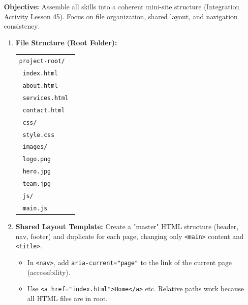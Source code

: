 \documentclass[11pt]{article}
\begin{document}
\begin{methode}
\textbf{Objective:} Assemble all skills into a coherent mini-site structure (Integration Activity \textemdash Lesson 45). Focus on file organization, shared layout, and navigation consistency.
\begin{enumerate}
    \item \textbf{File Structure (Root Folder):}
        \begin{center}
        \begin{tabular}{|p{0.95\linewidth}|}\hline
        \texttt{project-root/}\\
        \texttt{\textbar{}\textbar{} index.html}\\
        \texttt{\textbar{}\textbar{} about.html}\\
        \texttt{\textbar{}\textbar{} services.html}\\
        \texttt{\textbar{}\textbar{} contact.html}\\
        \texttt{\textbar{}\textbar{} css/}\\
        \texttt{\textbar{}\textbar{} \textbar{}\textbar{} style.css}\\
        \texttt{\textbar{}\textbar{} images/}\\
        \texttt{\textbar{}\textbar{} \textbar{}\textbar{} logo.png}\\
        \texttt{\textbar{}\textbar{} \textbar{}\textbar{} hero.jpg}\\
        \texttt{\textbar{}\textbar{} \textbar{}\textbar{} team.jpg}\\
        \texttt{\textbar{}\textbar{} js/}\\
        \texttt{\textbar{}\textbar{} \textbar{}\textbar{} main.js}\\\hline
        \end{tabular}
        \end{center}
    \item \textbf{Shared Layout Template:} Create a "master" HTML structure (header, nav, footer) and duplicate for each page, changing only \texttt{<main>} content and \texttt{<title>}.
        \begin{itemize}
            \item In \texttt{<nav>}, add \texttt{aria-current="page"} to the link of the current page (accessibility).
            \item Use \texttt{<a href="index.html">Home</a>} etc. Relative paths work because all HTML files are in root.

\end{itemize}
\end{enumerate}
\end{methode}
\end{document}
